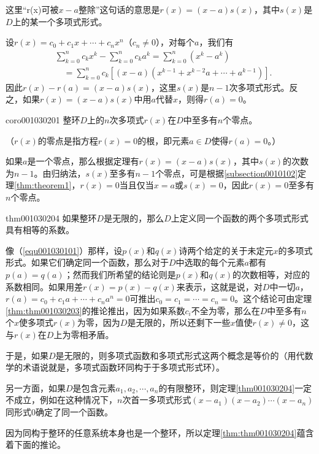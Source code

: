 这里“r(x)可被$x-a$整除”这句话的意思是$r(x)=(x-a)s(x)$，其中$s(x)$是$D$上的某一个多项式形式。

设$r(x)=c_0+c_1x+\cdots+c_nx^n$（$c_n \neq 0$），对每个$a$，我们有
\[
\begin{aligned}
&\sum_{k=0}^{n}{c_kx^k}-\sum_{k=0}^{n}{c_ka^k} = \sum_{k=0}^{n}{(x^k-a^k)}\\
&\quad=\sum_{k=0}^{n}{c_k[(x-a)(x^{k-1} + x^{k-2}a + \cdots + a^{k-1})]}.
\end{aligned}
\]
因此$r(x)-r(a)=(x-a)s(x)$，这里$s(x)$是$n-1$次多项式形式。反之，如果$r(x)=(x-a)s(x)$中用$a$代替$x$，则得$r(a)=0$。

\begin{corollary}{}{coro001030201}
整环$D$上的$n$次多项式$r(x)$在$D$中至多有$n$个零点。
\end{corollary}

（$r(x)$的零点是指方程$r(x)=0$的根，即元素$a \in D$使得$r(a)=0$。）

如果$a$是一个零点，那么根据定理有$r(x)=(x-a)s(x)$，其中$s(x)$的次数为$n-1$。由归纳法，$s(x)$至多有$n-1$个零点，可是根据\ref{subsection0010102}定理\ref{thm:theorem1}，$r(x)=0$当且仅当$x=a$或$s(x)=0$，因此$r(x)=0$至多有$n$个零点。

\begin{theorem}{}{thm001030204}
如果整环$D$是无限的，那么$D$上定义同一个函数的两个多项式形式具有相等的系数。
\end{theorem}

像（\ref{equ001030101}）那样，设$p(x)$和$q(x)$诗两个给定的关于未定元$x$的多项式形式。如果它们确定同一个函数，那么对于$D$中选取的每个元素$a$都有$p(a)=q(a)$；然而我们所希望的结论则是$p(x)$和$q(x)$的次数相等，对应的系数相同。如果用差$r(x)=p(x)-q(x)$来表示，这就是说，对$D$中一切$a$，$r(a)=c_0+c_1a+\cdots+c_na^n=0$可推出$c_0=c_1=\cdots=c_n=0$。这个结论可由定理\ref{thm:thm001030203}的推论推出，因为如果系数$c_i$不全为零，那么在$D$中至多有$n$个$x$使多项式$r(x)$为零，因为$D$是无限的，所以还剩下一些$x$值使$r(x) \neq 0$，这与$r(x)$在$D$上为零相矛盾。

于是，如果$D$是无限的，则多项式函数和多项式形式这两个概念是等价的（用代数学的术语说就是，多项式函数环同构于于多项式形式环）。

另一方面，如果$D$是包含元素$a_1,a_2,\cdots,a_n$的有限整环，则定理\ref{thm001030204}一定不成立，例如在这种情况下，$n$次首一多项式形式$(x-a_1)(x-a_2)\cdots(x-a_n)$同形式0确定了同一个函数。

因为同构于整环的任意系统本身也是一个整环，所以定理\ref{thm:thm001030204}蕴含着下面的推论。

